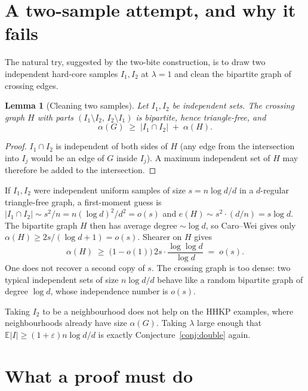 \documentclass[11pt]{article}
\newtheorem{lemma}[theorem]{Lemma}
\theoremstyle{definition}
\newcommand{\eps}{\varepsilon}
\newcommand{\E}{\mathbb{E}}
\begin{document}
\section{A two-sample attempt, and why it fails}

The natural try, suggested by the two-bite construction, is to draw two
independent hard-core samples $I_1,I_2$ at $\lambda=1$ and clean the bipartite
graph of crossing edges.

\begin{lemma}[Cleaning two samples]\label{lem:twosample}
Let $I_1,I_2$ be independent sets. The crossing graph $H$ with parts
$(I_1\setminus I_2,\,I_2\setminus I_1)$ is bipartite, hence triangle-free, and
\[
  \alpha(G)
  \;\ge\;
  |I_1\cap I_2|
  \;+\;
  \alpha(H).
\]
\end{lemma}

\begin{proof}
$I_1\cap I_2$ is independent of both sides of $H$ (any edge from the intersection
into $I_j$ would be an edge of $G$ inside $I_j$). A maximum independent set of
$H$ may therefore be added to the intersection.
\end{proof}

If $I_1,I_2$ were independent uniform samples of size $s=n\log d/d$ in a
$d$-regular triangle-free graph, a first-moment guess is
$|I_1\cap I_2|\sim s^{2}/n=n(\log d)^{2}/d^{2}=o(s)$ and
$e(H)\sim s^{2}\cdot(d/n)=s\log d$.
The bipartite graph $H$ then has average degree $\sim\log d$, so Caro--Wei
gives only $\alpha(H)\ge 2s/(\log d+1)=o(s)$.
Shearer on $H$ gives
\[
  \alpha(H)
  \;\ge\;
  \bigl(1-o(1)\bigr)\,
  2s\cdot\frac{\log\log d}{\log d}
  \;=\;
  o(s).
\]
One does not recover a second copy of $s$. The crossing graph is too dense:
two typical independent sets of size $n\log d/d$ behave like a random bipartite
graph of degree $\log d$, whose independence number is $o(s)$.

Taking $I_2$ to be a neighbourhood does not help on the HHKP examples, where
neighbourhoods already have size $\alpha(G)$.
Taking $\lambda$ large enough that $\E|I|\ge(1+\eps)n\log d/d$ is exactly
Conjecture~\ref{conj:double} again.

\section{What a proof must do}
\end{document}
